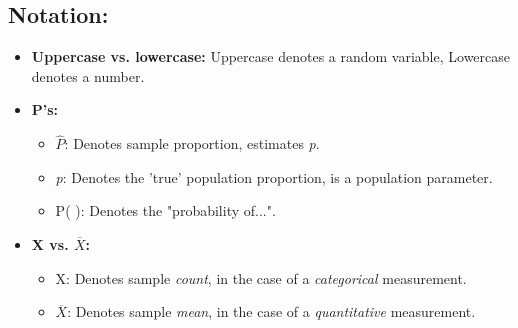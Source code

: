 \documentclass{article}
\begin{document}
\subsection*{Notation:}
\begin{itemize}
    \item \textbf{Uppercase vs. lowercase:} Uppercase denotes a random variable, Lowercase denotes a number.
    \item \textbf{P's:}
    \begin{itemize}
        \item $\hat{P}$: Denotes sample proportion, estimates \textit{p}.
        \item \textit{p}: Denotes the 'true' population proportion, is a population parameter.
        \item P( ): Denotes the "probability of...".
    \end{itemize}
    \item \textbf{X vs. $\overline{X}$:}
    \begin{itemize}
        \item X: Denotes sample \textit{count}, in the case of a \textit{categorical} measurement.
        \item $\overline{X}$: Denotes sample \textit{mean}, in the case of a \textit{quantitative} measurement.
    \end{itemize}
\end{itemize}
\end{document}
